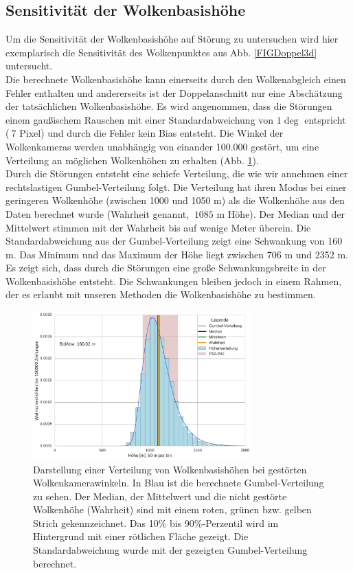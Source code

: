\documentclass[a4paper,11pt,twoside,german]{article}
\begin{document}
\subsection{Sensitivität der Wolkenbasishöhe}
\label{SECSens}
Um die Sensitivität der Wolkenbasishöhe auf Störung zu untersuchen wird hier exemplarisch die Sensitivität des Wolkenpunktes aus Abb. \ref{FIGDoppel3d} untersucht.\\
Die berechnete Wolkenbasishöhe kann einerseits durch den Wolkenabgleich einen Fehler enthalten und andererseits ist der Doppelanschnitt nur eine Abschätzung der tatsächlichen Wolkenbasishöhe. Es wird angenommen, dass die Störungen einem gaußischem Rauschen mit einer Standardabweichung von $1\deg$ entspricht ($~7$ Pixel) und durch die Fehler kein Bias entsteht. Die Winkel der Wolkenkameras werden unabhängig von einander 100.000 gestört, um eine Verteilung an möglichen Wolkenhöhen zu erhalten (Abb. \ref{FIGSens}).\\
Durch die Störungen entsteht eine schiefe Verteilung, die wie wir annehmen einer rechtslastigen Gumbel-Verteilung folgt. Die Verteilung hat ihren Modus bei einer geringeren Wolkenhöhe (zwischen 1000 und 1050 m) als die Wolkenhöhe aus den Daten berechnet wurde (Wahrheit genannt, $~1085$ m Höhe). Der Median und der Mittelwert stimmen mit der Wahrheit bis auf wenige Meter überein. Die Standardabweichung aus der Gumbel-Verteilung zeigt eine Schwankung von 160 m. Das Minimum und das Maximum der Höhe liegt zwischen 706 m und 2352 m.\\
Es zeigt sich, dass durch die Störungen eine große Schwankungsbreite in der Wolkenbasishöhe entsteht. Die Schwankungen bleiben jedoch in einem Rahmen, der es erlaubt mit unseren Methoden die Wolkenbasishöhe zu bestimmen.
\clearpage
\begin{figure}[h]
	\begin{center}
		\includegraphics[width=0.75\textwidth]{media/sens_prob_height.pdf}
		\caption[Wolkenhöhenverteilung von gestörten Wolkenkamerawinkeln]{Darstellung einer Verteilung von Wolkenbasishöhen bei gestörten Wolkenkamerawinkeln. In Blau ist die berechnete Gumbel-Verteilung zu sehen. Der Median, der Mittelwert und die nicht gestörte Wolkenhöhe (Wahrheit) sind mit einem roten, grünen bzw. gelben Strich gekennzeichnet. Das 10\% bis 90\%-Perzentil wird im Hintergrund mit einer rötlichen Fläche gezeigt. Die Standardabweichung wurde mit der gezeigten Gumbel-Verteilung berechnet.}
		\label{FIGSens}
	\end{center}
\end{figure}
\end{document}
